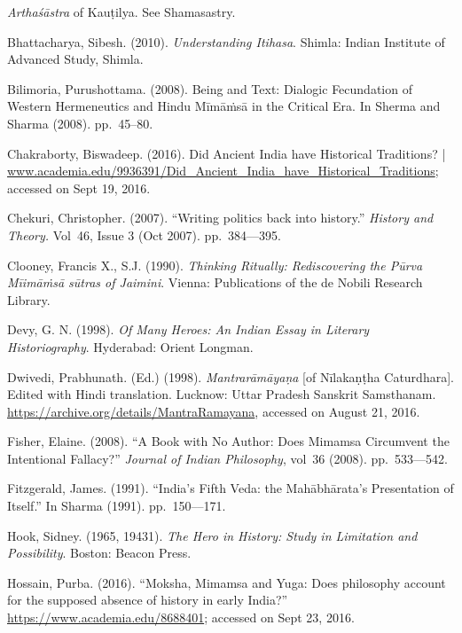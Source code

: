 \begin{thebibliography}{99}
 \textit{Arthaśāstra} of Kauṭilya. See Shamasastry.

  Bhattacharya, Sibesh. (2010). \textit{Understanding Itihasa}. Shimla: Indian Institute of Advanced Study, Shimla.

  Bilimoria, Purushottama. (2008). Being and Text: Dialogic Fecundation of Western Hermeneutics and Hindu Mīmāṁsā in the Critical Era. In Sherma and Sharma (2008). pp.~45–80.

  Chakraborty, Biswadeep. (2016). Did Ancient India have Historical Traditions? | \url{www.academia.edu/9936391/Did_Ancient_India_have_Historical_Traditions}; accessed on Sept 19, 2016.

  Chekuri, Christopher. (2007). “Writing politics back into history.” \textit{History and Theory.} Vol~46, Issue 3 (Oct 2007). pp.~384––395.

  Clooney, Francis X., S.J. (1990). \textit{Thinking Ritually: Rediscovering the Pūrva Mīimāṁsā sūtras of Jaimini}. Vienna: Publications of the de Nobili Research Library.

  Devy, G. N. (1998). \textit{Of Many Heroes: An Indian Essay in Literary Historiography}. Hyderabad: Orient Longman.

  Dwivedi, Prabhunath. (Ed.) (1998). \textit{Mantrarāmāyaṇa} [of Nīlakaṇṭha Caturdhara]. Edited with Hindi translation. Lucknow: Uttar Pradesh Sanskrit Samsthanam. \url{https://archive.org/details/MantraRamayana}, accessed on August 21, 2016. 

  Fisher, Elaine. (2008). “A Book with No Author: Does Mimamsa Circumvent the Intentional Fallacy?” \textit{Journal of Indian Philosophy}, vol~36 (2008). pp.~533––542.

  Fitzgerald, James. (1991). “India’s Fifth Veda: the Mahābhārata’s Presentation of Itself.” In Sharma (1991). pp.~150––171.

  Hook, Sidney. (1965, 19431). \textit{The Hero in History: Study in Limitation and Possibility}. Boston: Beacon Press.

  Hossain, Purba. (2016). “Moksha, Mimamsa and Yuga: Does philosophy account for the supposed absence of history in early India?” \url{https://www.academia.edu/8688401}; accessed on Sept 23, 2016.


\end{thebibliography}
